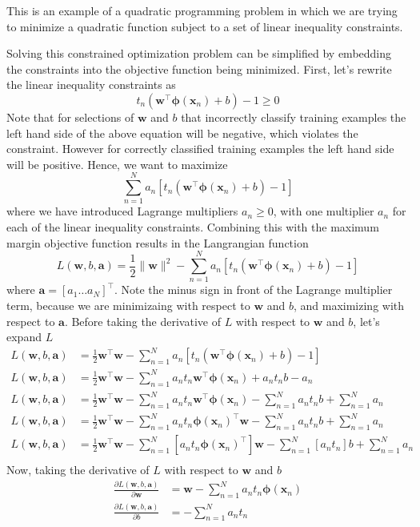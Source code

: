 \documentclass[12pt]{article}
\newcommand{\lp}{\left(}
\newcommand{\rp}{\right)}
\newcommand{\lb}{\left[}
\newcommand{\rb}{\right]}
\newcommand{\x}{\mathbf{x}}
\newcommand{\w}{\mathbf{w}}
\newcommand{\aVec}{\mathbf{a}}
\newcommand{\sumN}{\sum \limits_{n=1}^N}
\newcommand{\phiOfXn}{\mathbf{\phi}\left(\x_n\right)}
\newcommand{\wTPhiOfXn}{\w^\top\phiOfXn}
\newcommand{\phiOfXnTw}{\phiOfXn^\top\w}
\newcommand{\LFunc}{L\lp\w,b,\aVec\rp}
\newcommand{\dLdw}{\frac{\partial \LFunc}{\partial \w}}
\newcommand{\dLdb}{\frac{\partial \LFunc}{\partial b}}
\begin{document}
This is an example of a quadratic programming problem in which we are trying to
minimize a quadratic function subject to a set of linear inequality constraints.

Solving this constrained optimization problem can be simplified by embedding the
constraints into the objective function being minimized. First, let's rewrite
the linear inequality constraints as
%
\begin{equation*}
  t_n\lp\wTPhiOfXn + b\rp - 1 \ge 0
\end{equation*}
%
Note that for selections of $\w$ and $b$ that incorrectly classify training
examples the left hand side of the above equation will be negative, which
violates the constraint. However for correctly classified training examples
the left hand side will be positive. Hence, we want to maximize
%
\begin{equation*}
  \sumN a_n \lb t_n\lp\wTPhiOfXn + b\rp - 1 \rb
\end{equation*}
%
where we have introduced Lagrange multipliers $a_n \ge 0$, with one multiplier
$a_n$ for each of the linear inequality constraints. Combining this with the
maximum margin objective function results in the Langrangian function
%
\begin{equation*}
  \LFunc = \frac{1}{2}\|\w\|^2 - \sumN a_n \lb t_n\lp\wTPhiOfXn + b\rp - 1 \rb
\end{equation*}
%
where $\aVec = \lb a_1 \hdots a_N \rb^\top$. Note the minus sign in front of the
Lagrange multiplier term, because we are minimizaing with respect to $\w$ and
$b$, and maximizing with respect to $\aVec$. Before taking the derivative of
$L$ with respect to $\w$ and $b$, let's expand $L$
%
\begin{align*}
  \LFunc &= \frac{1}{2}\w^\top\w - \sumN a_n \lb t_n\lp\wTPhiOfXn + b\rp - 1 \rb \\
  \LFunc &= \frac{1}{2}\w^\top\w - \sumN a_nt_n\wTPhiOfXn + a_nt_nb - a_n \\
  \LFunc &= \frac{1}{2}\w^\top\w - \sumN a_nt_n\wTPhiOfXn - \sumN a_nt_nb + \sumN a_n \\
  \LFunc &= \frac{1}{2}\w^\top\w - \sumN a_nt_n\phiOfXnTw - \sumN a_nt_nb + \sumN a_n \\
  \LFunc &= \frac{1}{2}\w^\top\w - \sumN \lb a_nt_n\phiOfXn^\top \rb \w - \sumN \lb a_nt_n \rb b + \sumN a_n \\
\end{align*}
%
Now, taking the derivative of $L$ with respect to $\w$ and $b$
%
\begin{align*}
  \dLdw &= \w - \sumN a_nt_n\phiOfXn \\
  \dLdb &= - \sumN a_nt_n
\end{align*}
\end{document}
